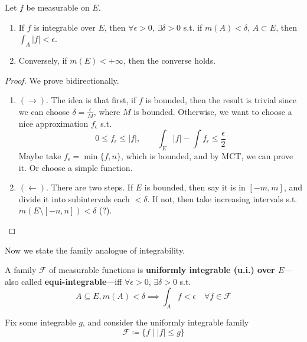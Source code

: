   \begin{theorem}
    Let $f$ be measurable on $E$. 
    \begin{enumerate}
      \item If $f$ is integrable over $E$, then $\forall \epsilon > 0$, $\exists \delta > 0$ s.t. if $m(A) < \delta$, $A \subset E$, then $\int_A |f| < \epsilon$. 
      \item Conversely, if $m(E) < +\infty$, then the converse holds. 
    \end{enumerate}
  \end{theorem}
  \begin{proof}
    We prove bidirectionally. 
    \begin{enumerate}
      \item $(\rightarrow)$. The idea is that first, if $f$ is bounded, then the result is trivial since we can choose $\delta = \frac{\epsilon}{M}$, where $M$ is bounded. Otherwise, we want to choose a nice approximation $f_\epsilon$ s.t. 
      \begin{equation}
        0 \leq f_\epsilon \leq |f|, \qquad \int_E |f| - \int f_\epsilon \leq \frac{\epsilon}{2}
      \end{equation}
      Maybe take $f_\epsilon = \min\{f, n\}$, which is bounded, and by MCT, we can prove it. Or choose a simple function.  

      \item $(\leftarrow)$. There are two steps. If $E$ is bounded, then say it is in $[-m, m]$, and divide it into subintervals each $< \delta$. If not, then take increasing intervals s.t. $m(E \setminus [-n, n]) < \delta$ (?). 
    \end{enumerate}
  \end{proof}

  Now we state the family analogue of integrability. 

  \begin{definition}
    A family $\mathscr{F}$ of measurable functions is \textbf{uniformly integrable (u.i.) over $E$}---also called \textbf{equi-integrable}---iff $\forall \epsilon > 0$, $\exists \delta > 0$ s.t. 
    \begin{equation}
      A \subseteq E, m(A) < \delta \implies \int_A f < \epsilon \quad \forall f \in \mathscr{F}
    \end{equation}
  \end{definition}

  \begin{example}
    Fix some integrable $g$, and consider the uniformly integrable family 
    \begin{equation}
      \mathscr{F} \coloneqq \{ f \mid |f| \leq g \}
    \end{equation}
  \end{example}

